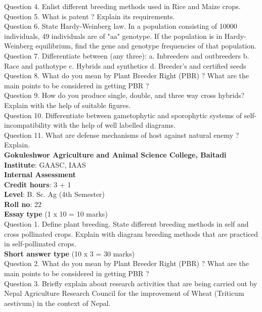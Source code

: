 \documentclass[12pt]{article}\usepackage[]{graphicx}\usepackage[]{color}
\begin{document}
Question 4. Enlist different breeding methods used in Rice and Maize crops.\\
Question 5. What is patent ? Explain its requirements.\\
Question 6. State Hardy-Weinberg law. In a population consisting of 10000 individuals, 49 individuals are of "aa" genotype. If the population is in Hardy-Weinberg equilibrium, find the gene and genotype frequencies of that population.\\
Question 7. Differentiate between (any three): a. Inbreeders and outbreeders b. Race and pathotype c. Hybrids and synthetics d. Breeder's and certified seeds\\
Question 8. What do you mean by Plant Breeder Right (PBR) ? What are the main points to be considered in getting PBR ?\\
Question 9. How do you produce single, double, and three way cross hybrids? Explain with the help of suitable figures.\\
Question 10. Differentiate between gametophytic and sporophytic systems of self-incompatibility with the help of well labelled diagrams.\\
Question 11. What are defense mechanisms of host against natural enemy ? Explain.\\
\clearpage 
{\centering \Large{\textbf{Gokuleshwor Agriculture and Animal Science College, Baitadi}} \\[0.25cm]
            \textbf{Institute}: GAASC, IAAS \\[0.2cm]
            \textbf{Internal Assessment} \\[0.2cm]} 
\textbf{Credit hours}: 3 + 1 \\ 
\textbf{Level}: B. Sc. Ag (4th Semester) \\
\textbf{Roll no}: 22 \\[0.5cm] 
\textbf{Essay type} (1 x 10 = 10 marks) \\
Question 1. Define plant breeding. State different breeding methods in self and cross pollinated crops. Explain with diagram breeding methods that are practiced in self-pollinated crops.\\
\textbf{Short answer type} (10 x 3 = 30 marks) \\
Question 2. What do you mean by Plant Breeder Right (PBR) ? What are the main points to be considered in getting PBR ?\\
Question 3. Briefly explain about research activities that are being carried out by Nepal Agriculture Research Council for the improvement of Wheat (Triticum aestivum) in the context of Nepal.\\
\end{document}

